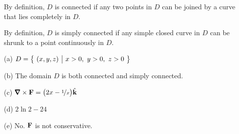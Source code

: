 \begin{hint} 
By definition, $D$ is connected if any two points in $D$
can be joined by a curve that lies completely in $D$.


By definition, $D$ is simply connected if any simple closed curve in 
$D$ can be shrunk to a point continuously in $D$.
\end{hint}

\begin{answer} 
(a) $D=\Set{(x,y,z)}{x>0,\ y>0,\ z>0}$

(b) The domain $D$ is both connected and simply connected.

(c) $\vnabla\times\vF=\big(2x-\nicefrac{1}{x}\big)\hk$

(d) $2\ln 2-24$

(e) No. $\mathbf{F}$ is not conservative.
\end{answer}


